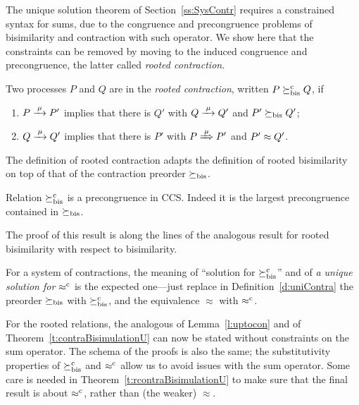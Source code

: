 The unique solution theorem of Section~\ref{ss:SysContr} requires a
constrained syntax for sums, due to the congruence and precongruence
problems of bisimilarity and contraction with such operator. 
We show here that the constraints can be
removed by moving to the induced congruence and precongruence, the
latter 
called \emph{rooted contraction}.
\begin{definition}
\label{d:rcontra}
Two processes $P$ and $Q$ are in the \emph{rooted contraction}, written 
 $P\mathrel{\succeq^{\rm{c}}_{\rm{bis}}} Q$, if
\begin{enumerate}
\item $P \arr\mu P'$ implies that there is $Q'$ with $Q \arr \mu Q'$
 and $P'\mathrel{\succeq_{\rm{bis}}} Q'$;
\item $Q \arr\mu Q'$   implies that there is $P'$ with $P \Arr \mu
 P'$ and $P' \approx Q'$.
\end{enumerate}
\end{definition}

The definition of rooted contraction adapts the definition of rooted
bisimilarity on top of that of the  contraction preorder
$\mathrel{\succeq_{\rm{bis}}}$.




\begin{theorem}
\label{t:rcontrPrecongruence}
Relation $\mathrel{\succeq^{\rm{c}}_{\rm{bis}}}$ is a precongruence in CCS.  Indeed it is the
largest precongruence contained in $\mathrel{\succeq_{\rm{bis}}}$.
\end{theorem}  
The proof of this result is along the lines of the analogous result
for rooted bisimilarity with respect to bisimilarity. 

For a system of contractions, the meaning of 
``solution for $\mathrel{\succeq^{\rm{c}}_{\rm{bis}}}$'' and of 
 \emph{a unique 
solution for $\mathrel{\approx^{\rm{c}}}$}
is the expected one---just replace in Definition~\ref{d:uniContra}  the preorder 
$\mathrel{\succeq_{\rm{bis}}}$ with $\mathrel{\succeq^{\rm{c}}_{\rm{bis}}}$, and the equivalence 
$\approx$ with $\mathrel{\approx^{\rm{c}}}$.

For the rooted relations, the analogous of Lemma~\ref{l:uptocon} and of
Theorem~\ref{t:contraBisimulationU} can now be stated without constraints on the sum
operator.  
The schema of the proofs is also the same; the substitutivity
properties of 
$\mathrel{\succeq^{\rm{c}}_{\rm{bis}}}$ and $\mathrel{\approx^{\rm{c}}}$ allow us to avoid issues with the sum
operator. Some care is needed in Theorem~\ref{t:rcontraBisimulationU}
to make sure that the final result is about  
$\mathrel{\approx^{\rm{c}}}$, rather than (the weaker) $\approx$.


